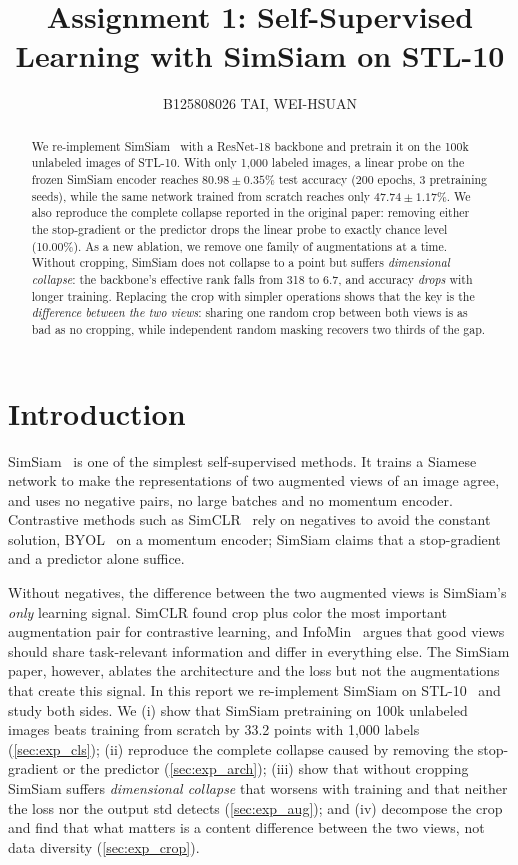 \documentclass[10pt,twocolumn,letterpaper]{article}
\title{Assignment 1: Self-Supervised Learning with SimSiam on STL-10}
\author{B125808026 TAI, WEI-HSUAN}
\begin{document}
\maketitle

\begin{abstract}
We re-implement SimSiam~\cite{chen2021simsiam} with a ResNet-18 backbone and pretrain it on the 100k unlabeled images of STL-10.
With only 1,000 labeled images, a linear probe on the frozen SimSiam encoder reaches $80.98\pm0.35\%$ test accuracy (200 epochs, 3 pretraining seeds), while the same network trained from scratch reaches only $47.74\pm1.17\%$.
We also reproduce the complete collapse reported in the original paper: removing either the stop-gradient or the predictor drops the linear probe to exactly chance level (10.00\%).
As a new ablation, we remove one family of augmentations at a time. Without cropping, SimSiam does not collapse to a point but suffers \emph{dimensional collapse}: the backbone's effective rank falls from 318 to 6.7, and accuracy \emph{drops} with longer training.
Replacing the crop with simpler operations shows that the key is the \emph{difference between the two views}: sharing one random crop between both views is as bad as no cropping, while independent random masking recovers two thirds of the gap.
\end{abstract}

\section{Introduction}
\label{sec:intro}

SimSiam~\cite{chen2021simsiam} is one of the simplest self-supervised methods. It trains a Siamese network to make the representations of two augmented views of an image agree, and uses no negative pairs, no large batches and no momentum encoder.
Contrastive methods such as SimCLR~\cite{chen2020simclr} rely on negatives to avoid the constant solution, BYOL~\cite{grill2020byol} on a momentum encoder; SimSiam claims that a stop-gradient and a predictor alone suffice.

Without negatives, the difference between the two augmented views is SimSiam's \emph{only} learning signal.
SimCLR found crop plus color the most important augmentation pair for contrastive learning, and InfoMin~\cite{tian2020infomin} argues that good views should share task-relevant information and differ in everything else.
The SimSiam paper, however, ablates the architecture and the loss but not the augmentations that create this signal.
In this report we re-implement SimSiam on STL-10~\cite{coates2011stl10} and study both sides.
We (i) show that SimSiam pretraining on 100k unlabeled images beats training from scratch by 33.2 points with 1,000 labels (\cref{sec:exp_cls});
(ii) reproduce the complete collapse caused by removing the stop-gradient or the predictor (\cref{sec:exp_arch});
(iii) show that without cropping SimSiam suffers \emph{dimensional collapse} that worsens with training and that neither the loss nor the output std detects (\cref{sec:exp_aug}); and
(iv) decompose the crop and find that what matters is a content difference between the two views, not data diversity (\cref{sec:exp_crop}).
\end{document}
